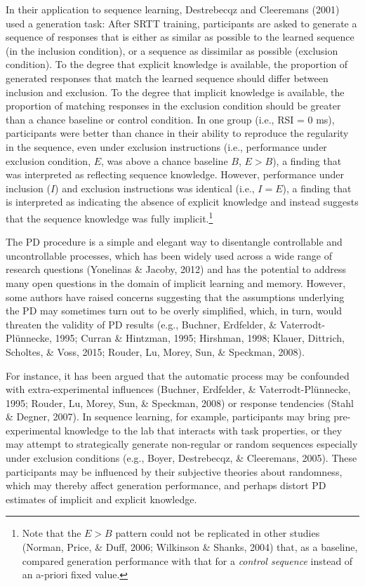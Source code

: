 \documentclass[
  english,
  man]{apa6}
\begin{document}
In their application to sequence learning, Destrebecqz and Cleeremans (2001) used a generation task:
After SRTT training, participants are asked to generate a sequence of responses that is either as similar as possible to the learned sequence (in the inclusion condition), or a sequence as dissimilar as possible (exclusion condition).
To the degree that explicit knowledge is available, the proportion of generated responses that match the learned sequence should differ between inclusion and exclusion.
To the degree that implicit knowledge is available, the proportion of matching responses in the exclusion condition should be greater than a chance baseline or control condition.
In one group (i.e., RSI = 0 ms), participants were better than chance in their ability to reproduce the regularity in the sequence, even under exclusion instructions (i.e., performance under exclusion condition, \(E\), was above a chance baseline \(B\), \(E>B\)), a finding that was interpreted as reflecting sequence knowledge.
However, performance under inclusion (\(I\)) and exclusion instructions was identical (i.e., \(I=E\)), a finding that is interpreted as indicating the absence of explicit knowledge and instead suggests that the sequence knowledge was fully implicit.\footnote{Note that the \(E>B\) pattern could not be replicated in other studies (Norman, Price, \& Duff, 2006; Wilkinson \& Shanks, 2004) that, as a baseline, compared generation performance with that for a \emph{control sequence} instead of an a-priori fixed value.}

The PD procedure is a simple and elegant way to disentangle controllable and uncontrollable processes, which has been widely used across a wide range of research questions (Yonelinas \& Jacoby, 2012) and has the potential to address many open questions in the domain of implicit learning and memory.
However, some authors have raised concerns suggesting that the assumptions underlying the PD may sometimes turn out to be overly simplified, which, in turn, would threaten the validity of PD results (e.g., Buchner, Erdfelder, \& Vaterrodt-Plünnecke, 1995; Curran \& Hintzman, 1995; Hirshman, 1998; Klauer, Dittrich, Scholtes, \& Voss, 2015; Rouder, Lu, Morey, Sun, \& Speckman, 2008).

For instance, it has been argued that the automatic process may be confounded with extra-experimental influences (Buchner, Erdfelder, \& Vaterrodt-Plünnecke, 1995; Rouder, Lu, Morey, Sun, \& Speckman, 2008) or response tendencies (Stahl \& Degner, 2007).
In sequence learning, for example, participants may bring pre-experimental knowledge to the lab that interacts with task properties, or they may attempt to strategically generate non-regular or random sequences especially under exclusion conditions (e.g., Boyer, Destrebecqz, \& Cleeremans, 2005).
These participants may be influenced by their subjective theories about randomness, which may thereby affect generation performance, and perhaps distort PD estimates of implicit and explicit knowledge.
\end{document}
